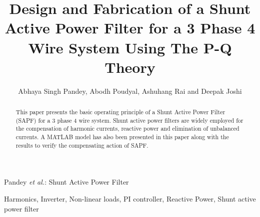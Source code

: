 \documentclass[journal,twoside]{IEEEtran}
\begin{document}
    \setcounter{page}{9}
    \title{Design and Fabrication of a Shunt Active Power Filter for a 3 Phase 4 Wire System Using The P-Q Theory}
    \author{{Abhaya Singh Pandey, Abodh Poudyal, Ashuhang Rai and Deepak Joshi}\\
  }

%
{Pandey \MakeLowercase{\textit{et al.}}: Shunt Active Power Filter}

\maketitle

\begin{abstract}
This paper presents the basic operating principle of a Shunt Active Power Filter (SAPF) for a 3 phase 4 wire system. Shunt active power filters are widely employed for the compensation of harmonic currents, reactive power and elimination of unbalanced currents. A MATLAB model has also been presented in this paper along with the results to verify the compensating action of SAPF.
\end{abstract}


	\begin{IEEEkeywords}
Harmonics, Inverter, Non-linear loads, PI controller, Reactive Power, Shunt active power filter 
	\end{IEEEkeywords}
\end{document}
